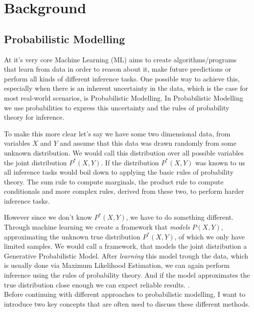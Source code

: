 \usetikzlibrary{calc}

\renewcommand{\vec}[1]{\textbf{#1}}
\newcommand{\norm}[1]{\left\lVert#1\right\rVert}


\chapter{Background}
\label{cha:background}

\section{Probabilistic Modelling}
\label{sec:pm}

At it's very core Machine Learning (ML) aims to create algorithms/programs that learn from data in order to reason about it, make future
predictions or perform all kinds of different inference tasks. One possible way to achieve this, especially when there is an inherent 
uncertainty in the data, which is the case for most real-world scenarios, is Probabilistic Modelling. In Probabilistic Modelling we 
use probabilities to express this uncertainty and the rules of probability theory for inference. 

To make this more clear let's say we have some two dimensional data, from variables $X$ and $Y$ and assume that this data was drawn randomly from some unknown distribution. 
We would call this distribution over all possible variables the joint distribution $P^*(X, Y)$. 
If the distribution $P^*(X, Y)$ was known to us all inference tasks would boil down to applying the basic 
rules of probability theory. The sum rule to compute marginals, the product rule to compute conditionals and more complex rules, derived 
from these two, to perform harder inference tasks. 

However since we don't know $P^*(X, Y)$, we have to do something different.
Through machine learning we create a framework that \emph{models} $P(X, Y)$, approximating the unknown true distribution $P^*(X, Y)$, of which we only have limited samples.
We would call a framework, that models the joint distribution a Generative Probabilistic Model. 
After \emph{learning} this model trough the data, which is usually done via Maximum Likelihood Estimation, we can again perform inference using the rules 
of probability theory. And if the model approximates the true distribution close enough we can expect reliable results. \cite{pc_intro}. \\


Before continuing with different approaches to probabilistic modelling, I want to introduce two key concepts that are often 
used to discuss these different methods. \\

